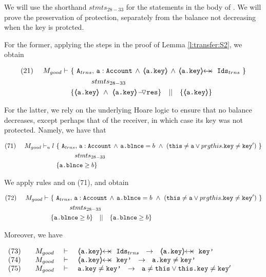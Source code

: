 \begin{proofO}
We will use   the shorthand $stmts_{28-33}$ for the statements in the body of . 
We will prove   the preservation of protection, separately from the balance not decreasing when the key is protcted.

For the former, applying the steps in the proof of Lemma \ref{l:transfer:S2},  we obtain

\small
 \begin{align*}
\text{(21)}  \ \ \ \ M_{good} \vdash \ 
		&	\{  \ \Alocalstr, \, \prg{a}:\prg{Account}\, \wedge\,  {\inside{\prg{a.key}}} \, \wedge \, \protectedFrom {\prg{a.key}} {\Idstr}  \  \} \\
		&  \SPT   stmts_{28-33} \\
		& \{ {\inside{\prg{a.key}}}\ \wedge\ {\PushASLong {\prg{res}} {\inside{\prg{a.key}}}}  \} \ \ \  || \ \ \ 
		   \{ {\inside{\prg{a.key}}} \}
\end{align*}
\normalsize

For the latter, we  rely on the underlying Hoare logic to ensure that no balance decreases, except perhaps that of the receiver, in which case its key was not protected.
Namely, we have that

\small
 \begin{align*}
 \text{(71)}  \ \ \ \ M_{good} \vdash_ul \ 
		&	\{  \ \Alocalstr, \, \prg{a}:\prg{Account}\, \wedge\,  \prg{a.\balance}=b\ \wedge \ (\prg{this}\neq \prg{a} \vee prg{this}.\prg{key}\neq \prg{key}' ) \  \} \\
		&  \SPT   stmts_{28-33} \\
		& \{ \prg{a.\balance}\geq b \}
\end{align*}
\normalsize

We apply rules {} and   {} on (71), and obtain

\small
 \begin{align*}
 \text{(72)}  \ \ \ \ M_{good} \vdash  \ 
		&	\{  \ \Alocalstr, \, \prg{a}:\prg{Account}\, \wedge\,  \prg{a.\balance}=b\ \wedge \ (\prg{this}\neq \prg{a} \vee prg{this}.\prg{key}\neq \prg{key}' ) \  \} \\
		&  \SPT   stmts_{28-33} \\
		& \{ \prg{a.\balance}\geq b \} \ \ \  || \ \ \  \{ \prg{a.\balance}\geq b \}
\end{align*}
\normalsize

Moreover, we have 

\small
$\begin{array}{llll}
 \text{(73)} \ \ \  & M_{good}\  & \vdash  \ & \protectedFrom {\prg{a.key}} {\Idstr}\ \  \rightarrow \ \ \protectedFrom {\prg{a.key}} {\prg{key'}} \\
 \text{(74)} &  M_{good}  & \vdash  & \protectedFrom {\prg{a.key}} {\prg{key'}} \ \  \rightarrow\ \  \prg{a.key} \neq \prg{key'}  \\
  \text{(75)} &  M_{good}  & \vdash  &    \prg{a.key} \neq  \prg{key'}  \ \ \rightarrow \ \ \prg{a}\neq \prg{this} \vee \prg{this.key}\neq \prg{key}'
\end{array}
$


\end{proofO}
